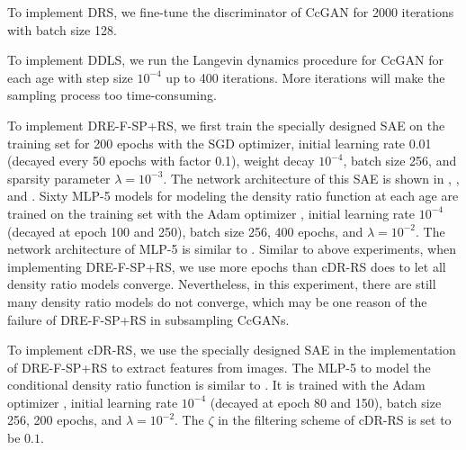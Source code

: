 \documentclass[final,12pt, 3p,times]{elsarticle}
\begin{document}
To implement DRS, we fine-tune the discriminator of CcGAN for 2000 iterations with batch size 128.  

To implement DDLS, we run the Langevin dynamics procedure for CcGAN for each age with step size $10^{-4}$ up to 400 iterations. More iterations will make the sampling process too time-consuming.

To implement DRE-F-SP+RS, we first train the specially designed SAE on the training set for 200 epochs with the SGD optimizer, initial learning rate 0.01 (decayed every 50 epochs with factor 0.1), weight decay $10^{-4}$, batch size 256, and sparsity parameter $\lambda=10^{-3}$. The network architecture of this SAE is shown in , , and . Sixty MLP-5 models for modeling the density ratio function at each age are trained on the training set with the Adam optimizer \cite{kingma2014adam}, initial learning rate $10^{-4}$ (decayed at epoch 100 and 250), batch size 256, 400 epochs, and $\lambda=10^{-2}$. The network architecture of MLP-5 is similar to . Similar to above experiments, when implementing DRE-F-SP+RS, we use more epochs than cDR-RS does to let all density ratio models converge. Nevertheless, in this experiment, there are still many density ratio models do not converge, which may be one reason of the failure of DRE-F-SP+RS in subsampling CcGANs.

To implement cDR-RS, we use the specially designed SAE in the implementation of DRE-F-SP+RS to extract features from images. The MLP-5 to model the conditional density ratio function is similar to . It is trained with the Adam optimizer \cite{kingma2014adam}, initial learning rate $10^{-4}$ (decayed at epoch 80 and 150), batch size 256, 200 epochs, and $\lambda=10^{-2}$. The $\zeta$ in the filtering scheme of cDR-RS is set to be $0.1$. 
\end{document}
